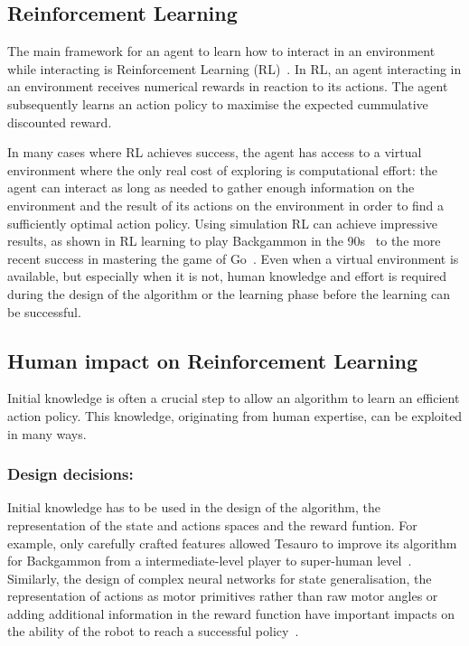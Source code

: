 \documentclass[letterpaper]{article} %
\begin{document}
\subsection{Reinforcement Learning}

The main framework for an agent to learn how to interact in an environment while
interacting is Reinforcement Learning
(RL)~\cite{kober2013reinforcement,sutton1998reinforcement}. In RL, an agent
interacting in an environment receives numerical rewards in reaction to its
actions. The agent subsequently learns an action policy to maximise the expected
cummulative discounted reward.

In many cases where RL achieves success, the agent has access to a virtual
environment where the only real cost of exploring is computational effort: the
agent can interact as long as needed to gather enough information on the
environment and the result of its actions on the environment in order to find a
sufficiently optimal action policy. Using simulation RL can achieve impressive
results, as shown in RL learning to play Backgammon in the
90s~\cite{tesauro1995temporal} to the more recent success in mastering the game
of Go~\cite{silver2016mastering}. Even when a virtual environment is available,
but especially when it is not, human knowledge and effort is required during the
design of the algorithm or the learning phase before the learning can be
successful.

\subsection{Human impact on Reinforcement Learning}

Initial knowledge is often a crucial step to allow an algorithm to learn an
efficient action policy. This knowledge, originating from human expertise, can
be exploited in many ways. 

\subsubsection{Design decisions:}

Initial knowledge has to be used in the design of the algorithm, the
representation of the state and actions spaces and the reward funtion. For
example, only carefully crafted features allowed Tesauro to improve its
algorithm for Backgammon from a intermediate-level player to super-human
level~\cite{tesauro1995temporal}. Similarly, the design of complex neural
networks for state generalisation, the representation of actions as motor
primitives rather than raw motor angles or adding additional information in the
reward function have important impacts on the ability of the robot to reach a
successful policy~\cite{kober2013reinforcement}.
\end{document}

